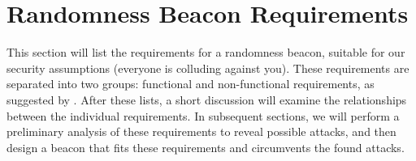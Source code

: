 \section{Randomness Beacon Requirements}
\label{sec:beacon_requirements}

This section will list the requirements for a randomness beacon, suitable for our security assumptions (everyone is colluding against you). These requirements are separated into two groups: functional and non-functional requirements, as suggested by \citet[sec.\ 1.4.1]{swebok}. After these lists, a short discussion will examine the relationships between the individual requirements. In subsequent sections, we will perform a preliminary analysis of these requirements to reveal possible attacks, and then design a beacon that fits these requirements and circumvents the found attacks.

